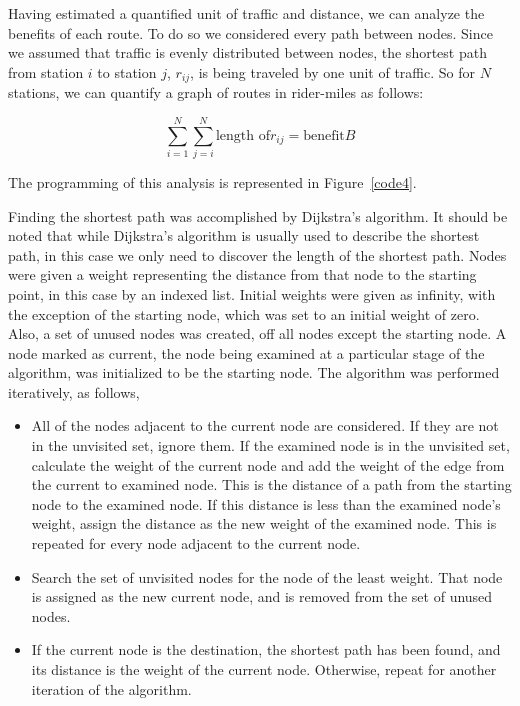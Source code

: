 \documentclass{article}
\begin{document}
Having estimated a quantified unit of traffic and distance, we can analyze the benefits of each route.  To do so we considered every path between nodes.  Since we assumed that traffic is evenly distributed between nodes, the shortest path from station $i$ to station $j$, $r_{ij}$, is being traveled by one unit of traffic.  So for $N$ stations, we can quantify a graph of routes in rider-miles as follows: 

\begin{equation*} \sum_{i = 1}^{N} \sum_{j = i}^{N} \text{length of} r_{ij} = \text{benefit} B \end{equation*} 

The programming of this analysis is represented in Figure~\ref{code4}. 

Finding the shortest path was accomplished by Dijkstra's algorithm.  It should be noted that while Dijkstra's algorithm is usually used to describe the shortest path, in this case we only need to discover the length of the shortest path.  Nodes were given a weight representing the distance from that node to the starting point, in this case by an indexed list.  Initial weights were given as infinity, with the exception of the starting node, which was set to an initial weight of zero.  Also, a set of unused nodes was created, off all nodes except the starting node.  A node marked as current, the node being examined at a particular stage of the algorithm, was initialized to be the starting node.  The algorithm was performed iteratively, as follows, 
\begin{itemize} 
    \item All of the nodes adjacent to the current node are considered.  If they are not in the unvisited set, ignore them.  If the examined node is in the unvisited set, calculate the weight of the current node and add the weight of the edge from the current to examined node.  This is the distance of a path from the starting node to the examined node.  If this distance is less than the examined node's weight, assign the distance as the new weight of the examined node.  This is repeated for every node adjacent to the current node.
    \item Search the set of unvisited nodes for the node of the least weight.  That node is assigned as the new current node, and is removed from the set of unused nodes.
    \item If the current node is the destination, the shortest path has been found, and its distance is the weight of the current node.  Otherwise, repeat for another iteration of the algorithm.
\end{itemize} 
    
\end{document}

